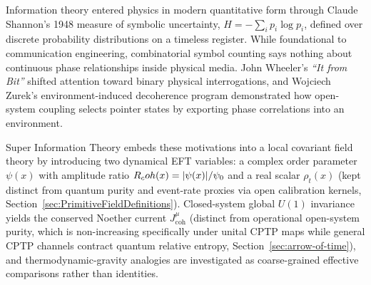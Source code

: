 Information theory entered physics in modern quantitative form through Claude Shannon's 1948 measure of symbolic uncertainty, $H = -\sum_i p_i \log p_i$, defined over discrete probability distributions on a timeless register. While foundational to communication engineering, combinatorial symbol counting says nothing about continuous phase relationships inside physical media. John Wheeler's \emph{``It from Bit''} shifted attention toward binary physical interrogations, and Wojciech Zurek's environment-induced decoherence program demonstrated how open-system coupling selects pointer states by exporting phase correlations into an environment.

Super Information Theory embeds these motivations into a local covariant field theory by introducing two dynamical EFT variables: a complex order parameter $\psi(x)$ with amplitude ratio $R_coh(x) = |\psi(x)|/\psi_0$ and a real scalar $\rho_t(x)$ (kept distinct from quantum purity and event-rate proxies via open calibration kernels, Section~\ref{sec:PrimitiveFieldDefinitions}). Closed-system global $U(1)$ invariance yields the conserved Noether current $J^\mu_{\mathrm{coh}}$ (distinct from operational open-system purity, which is non-increasing specifically under unital CPTP maps while general CPTP channels contract quantum relative entropy, Section~\ref{sec:arrow-of-time}), and thermodynamic-gravity analogies are investigated as coarse-grained effective comparisons rather than identities.

